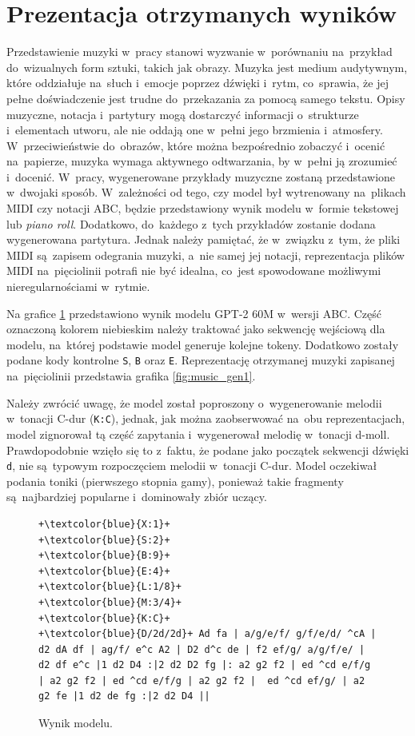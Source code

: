 \documentclass[data-science]{agh-wi} %
\begin{document}
\section{Prezentacja otrzymanych wyników}
Przedstawienie muzyki w~pracy stanowi wyzwanie w~porównaniu na~przykład do~wizualnych form sztuki, takich jak obrazy. Muzyka jest medium audytywnym, które oddziałuje na~słuch i~emocje poprzez dźwięki i~rytm, co~sprawia, że jej pełne doświadczenie jest trudne do~przekazania za pomocą samego tekstu. Opisy muzyczne, notacja i~partytury mogą dostarczyć informacji o~strukturze i~elementach utworu, ale nie oddają one w~pełni jego brzmienia i~atmosfery. W~przeciwieństwie do~obrazów, które można bezpośrednio zobaczyć i~ocenić na~papierze, muzyka wymaga aktywnego odtwarzania, by w~pełni ją zrozumieć i~docenić. W~pracy, wygenerowane przykłady muzyczne zostaną przedstawione w~dwojaki sposób. W~zależności od tego, czy model był wytrenowany na~plikach MIDI czy notacji ABC, będzie przedstawiony wynik modelu w~formie tekstowej lub \textit{piano roll}. Dodatkowo, do~każdego z~tych przykładów zostanie dodana wygenerowana partytura. Jednak należy pamiętać, że w~związku z~tym, że pliki MIDI są~zapisem odegrania muzyki, a~nie samej jej notacji, reprezentacja plików MIDI na~pięciolinii potrafi nie być idealna, co~jest spowodowane możliwymi nieregularnościami w~rytmie.

Na grafice \ref*{code:music_gen1} przedstawiono wynik modelu GPT-2 60M w~wersji ABC. Część oznaczoną kolorem niebieskim należy traktować jako sekwencję wejściową dla modelu, na~której podstawie model generuje kolejne tokeny. Dodatkowo zostały podane kody kontrolne \texttt{S}, \texttt{B} oraz \texttt{E}. Reprezentację otrzymanej muzyki zapisanej na~pięciolinii przedstawia grafika \ref*{fig:music_gen1}.

Należy zwrócić uwagę, że model został poproszony o~wygenerowanie melodii w~tonacji C-dur (\texttt{K:C}), jednak, jak można zaobserwować na~obu reprezentacjach, model zignorował tą część zapytania i~wygenerował melodię w~tonacji d-moll. Prawdopodobnie wzięło się to z~faktu, że podane jako początek sekwencji dźwięki \texttt{d}, nie są~typowym rozpoczęciem melodii w~tonacji C-dur. Model oczekiwał podania toniki (pierwszego stopnia gamy), ponieważ takie fragmenty są~najbardziej popularne i~dominowały zbiór uczący.

\begin{figure}[ht!]
    \begin{verbatim}
+\textcolor{blue}{X:1}+
+\textcolor{blue}{S:2}+
+\textcolor{blue}{B:9}+
+\textcolor{blue}{E:4}+
+\textcolor{blue}{L:1/8}+
+\textcolor{blue}{M:3/4}+
+\textcolor{blue}{K:C}+
+\textcolor{blue}{D/2d/2d}+ Ad fa | a/g/e/f/ g/f/e/d/ ^cA | d2 dA df | ag/f/ e^c A2 | D2 d^c de | f2 ef/g/ a/g/f/e/ | d2 df e^c |1 d2 D4 :|2 d2 D2 fg |: a2 g2 f2 | ed ^cd e/f/g | a2 g2 f2 | ed ^cd e/f/g | a2 g2 f2 |  ed ^cd ef/g/ | a2 g2 fe |1 d2 de fg :|2 d2 D4 ||
    \end{verbatim}
    \caption{Wynik modelu.}\label{code:music_gen1}
\end{figure}
\end{document}
